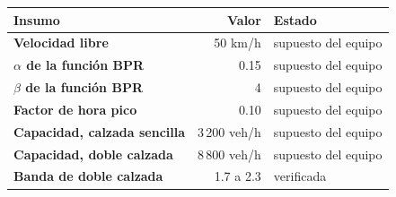 \renewcommand{\arraystretch}{1.2}
\begin{tabular}{|l|r|l|}
\hline
\rowcolor{gray!20} \textbf{Insumo} & \textbf{Valor} & \textbf{Estado} \\
\hline
\textbf{Velocidad libre} & 50 km/h & supuesto del equipo \\
\hline
\textbf{$\alpha$ de la función BPR} & 0.15 & supuesto del equipo \\
\hline
\textbf{$\beta$ de la función BPR} & 4 & supuesto del equipo \\
\hline
\textbf{Factor de hora pico} & 0.10 & supuesto del equipo \\
\hline
\textbf{Capacidad, calzada sencilla} & 3\,200 veh/h & supuesto del equipo \\
\hline
\textbf{Capacidad, doble calzada} & 8\,800 veh/h & supuesto del equipo \\
\hline
\textbf{Banda de doble calzada} & 1.7 a 2.3 & verificada \\
\hline
\end{tabular}
